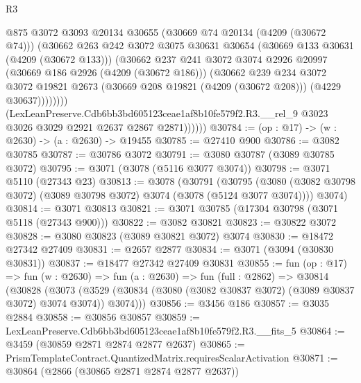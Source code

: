 \begin{lexlean}{R3}
\begin{coremodule}
                      @875
                      @3072
                      @3093
                      @20134
                      @30655
                      (@30669 @74 @20134 (@4209 (@30672 @74)))
                      (@30662
                        @263
                        @242
                        @3072
                        @3075
                        @30631
                        @30654
                        (@30669 @133 @30631 (@4209 (@30672 @133)))
                        (@30662
                          @237
                          @241
                          @3072
                          @3074
                          @2926
                          @20997
                          (@30669 @186 @2926 (@4209 (@30672 @186)))
                          (@30662
                            @239
                            @234
                            @3072
                            @3072
                            @19821
                            @2673
                            (@30669 @208 @19821 (@4209 (@30672 @208)))
                            (@4229 @30637))))))))
              (LexLeanPreserve.Cdb6bb3bd605123ceae1af8b10fe579f2.R3.__rel_9
                @3023
                @3026
                @3029
                @2921
                @2637
                @2867
                @2871))))))
@30784 := (op : @17) -> (w : @2630) -> (a : @2630) -> @19455
@30785 := @27410 @900
@30786 := @3082 @30785
@30787 := @30786 @3072
@30791 := @3080 @30787 (@3089 @30785 @3072)
@30795 := @3071 (@3078 (@5116 @3077 @3074))
@30798 := @3071 @5110 (@27343 @23)
@30813 := @3078
    (@30791
      (@30795 (@3080 (@3082 @30798 @3072) (@3089 @30798 @3072) @3074 (@3078 (@5124 @3077 @3074))))
      @3074)
@30814 := @3071 @30813
@30821 := @3071 @30785 (@17304 @30798 (@3071 @5118 (@27343 @900)))
@30822 := @3082 @30821
@30823 := @30822 @3072
@30828 := @3080 @30823 (@3089 @30821 @3072) @3074
@30830 := @18472 @27342 @27409
@30831 := @2657 @2877
@30834 := @3071 (@3094 (@30830 @30831))
@30837 := @18477 @27342 @27409 @30831
@30855 := fun (op : @17) =>
  fun (w : @2630) =>
  fun (a : @2630) =>
  fun (full : @2862) =>
  @30814
    (@30828
      (@3073 (@3529 (@30834 (@3080 (@3082 @30837 @3072) (@3089 @30837 @3072) @3074 @3074)) @3074)))
@30856 := @3456 @186
@30857 := @3035 @2884
@30858 := @30856 @30857
@30859 := LexLeanPreserve.Cdb6bb3bd605123ceae1af8b10fe579f2.R3.__fits_5
@30864 := @3459 (@30859 @2871 @2874 @2877 @2637)
@30865 := PrismTemplateContract.QuantizedMatrix.requiresScalarActivation
@30871 := @30864 (@2866 (@30865 @2871 @2874 @2877 @2637))

\end{coremodule}
\end{lexlean}
